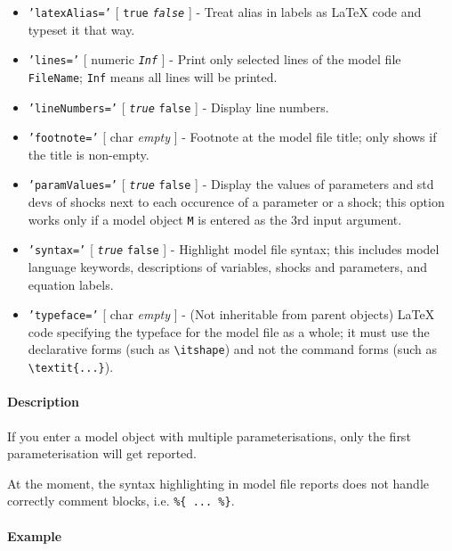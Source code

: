 \begin{itemize}
\item
  \texttt{'latexAlias='} {[} \texttt{true} \textbar{}
  \emph{\texttt{false}} {]} - Treat alias in labels as LaTeX code and
  typeset it that way.
\item
  \texttt{'lines='} {[} numeric \textbar{} \emph{\texttt{Inf}} {]} -
  Print only selected lines of the model file \texttt{FileName};
  \texttt{Inf} means all lines will be printed.
\item
  \texttt{'lineNumbers='} {[} \emph{\texttt{true}} \textbar{}
  \texttt{false} {]} - Display line numbers.
\item
  \texttt{'footnote='} {[} char \textbar{} \emph{empty} {]} - Footnote
  at the model file title; only shows if the title is non-empty.
\item
  \texttt{'paramValues='} {[} \emph{\texttt{true}} \textbar{}
  \texttt{false} {]} - Display the values of parameters and std devs of
  shocks next to each occurence of a parameter or a shock; this option
  works only if a model object \texttt{M} is entered as the 3rd input
  argument.
\item
  \texttt{'syntax='} {[} \emph{\texttt{true}} \textbar{} \texttt{false}
  {]} - Highlight model file syntax; this includes model language
  keywords, descriptions of variables, shocks and parameters, and
  equation labels.
\item
  \texttt{'typeface='} {[} char \textbar{} \emph{empty} {]} - (Not
  inheritable from parent objects) LaTeX code specifying the typeface
  for the model file as a whole; it must use the declarative forms (such
  as \texttt{\textbackslash{}itshape}) and not the command forms (such
  as \texttt{\textbackslash{}textit\{...\}}).
\end{itemize}

\paragraph{Description}\label{description}

If you enter a model object with multiple parameterisations, only the
first parameterisation will get reported.

At the moment, the syntax highlighting in model file reports does not
handle correctly comment blocks, i.e. \texttt{\%\{ ... \%\}}.

\paragraph{Example}\label{example}



